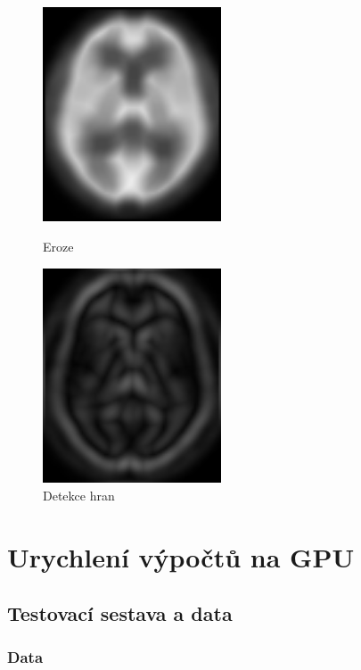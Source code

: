      \begin{figure}[h]
        \begin{minipage}[l]{0.5\textwidth}
            \center
            \includegraphics[width = 150pt]{src/8Appendix/final/eroze.png}
            \caption{Eroze}
        \end{minipage}
        \begin{minipage}[r]{0.5\textwidth}
            \center
            \includegraphics[width = 150pt]{src/8Appendix/final/hrany.png}
            \caption{Detekce hran}
        \end{minipage}
    \end{figure}
    \vfill
    \newpage
     
\section{Urychlení výpočtů na GPU}

    \subsection{Testovací sestava a data}

    \subsubsection{Data}

